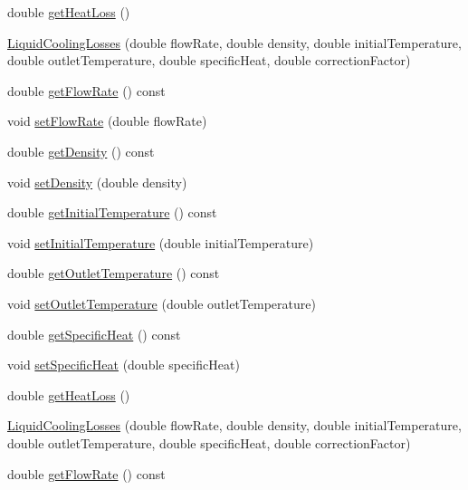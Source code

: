 \begin{DoxyCompactItemize}
\item 
double \hyperlink{class_liquid_cooling_losses_a6a131f8f3141edef7f29df4455c6aee5}{get\+Heat\+Loss} ()
\item 
\hyperlink{class_liquid_cooling_losses_a91eb84033b28a6bcfc817c08c317e63e}{Liquid\+Cooling\+Losses} (double flow\+Rate, double density, double initial\+Temperature, double outlet\+Temperature, double specific\+Heat, double correction\+Factor)
\item 
double \hyperlink{class_liquid_cooling_losses_acb4a68199bdc5f0597d1feadc3ecdb2c}{get\+Flow\+Rate} () const
\item 
void \hyperlink{class_liquid_cooling_losses_a7739742c5f21919a62c304b7c525b1b6}{set\+Flow\+Rate} (double flow\+Rate)
\item 
double \hyperlink{class_liquid_cooling_losses_ab2a34915eeba8bcea46d67a72cbe17d2}{get\+Density} () const
\item 
void \hyperlink{class_liquid_cooling_losses_a1fcb1780b588e0a6e5ca052ce2b360dc}{set\+Density} (double density)
\item 
double \hyperlink{class_liquid_cooling_losses_a4cfb23800b80e99858bbc5c3ef5169eb}{get\+Initial\+Temperature} () const
\item 
void \hyperlink{class_liquid_cooling_losses_aa7f7718de77a96b8e269a06a24d297d8}{set\+Initial\+Temperature} (double initial\+Temperature)
\item 
double \hyperlink{class_liquid_cooling_losses_ae6364da9b374e95dd657096350464acb}{get\+Outlet\+Temperature} () const
\item 
void \hyperlink{class_liquid_cooling_losses_ab8ea8e748853e18fa480afa0b3e417ee}{set\+Outlet\+Temperature} (double outlet\+Temperature)
\item 
double \hyperlink{class_liquid_cooling_losses_aa60623b6f1fab605d25c9c24e8dd00ec}{get\+Specific\+Heat} () const
\item 
void \hyperlink{class_liquid_cooling_losses_a38ff1ff4dc0de69c72db094bf2259993}{set\+Specific\+Heat} (double specific\+Heat)
\item 
double \hyperlink{class_liquid_cooling_losses_a6a131f8f3141edef7f29df4455c6aee5}{get\+Heat\+Loss} ()
\item 
\hyperlink{class_liquid_cooling_losses_a91eb84033b28a6bcfc817c08c317e63e}{Liquid\+Cooling\+Losses} (double flow\+Rate, double density, double initial\+Temperature, double outlet\+Temperature, double specific\+Heat, double correction\+Factor)
\item 
double \hyperlink{class_liquid_cooling_losses_acb4a68199bdc5f0597d1feadc3ecdb2c}{get\+Flow\+Rate} () const

\end{DoxyCompactItemize}
